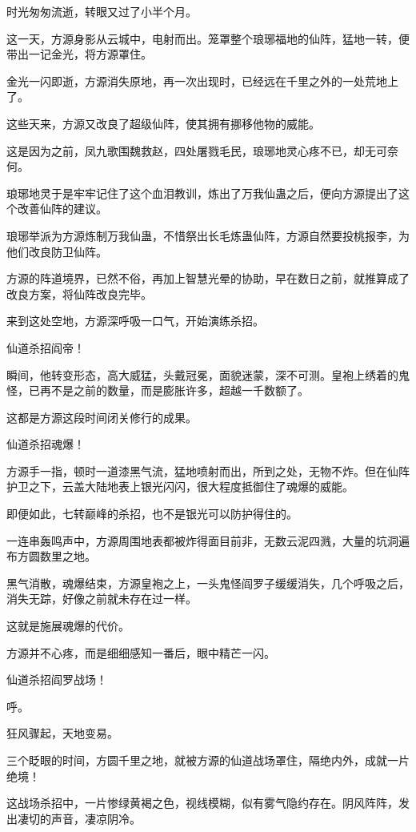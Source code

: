 
\begin{this_body}

时光匆匆流逝，转眼又过了小半个月。

这一天，方源身影从云城中，电射而出。笼罩整个琅琊福地的仙阵，猛地一转，便带出一记金光，将方源罩住。

金光一闪即逝，方源消失原地，再一次出现时，已经远在千里之外的一处荒地上了。

这些天来，方源又改良了超级仙阵，使其拥有挪移他物的威能。

这是因为之前，凤九歌围魏救赵，四处屠戮毛民，琅琊地灵心疼不已，却无可奈何。

琅琊地灵于是牢牢记住了这个血泪教训，炼出了万我仙蛊之后，便向方源提出了这个改善仙阵的建议。

琅琊举派为方源炼制万我仙蛊，不惜祭出长毛炼蛊仙阵，方源自然要投桃报李，为他们改良防卫仙阵。

方源的阵道境界，已然不俗，再加上智慧光晕的协助，早在数日之前，就推算成了改良方案，将仙阵改良完毕。

来到这处空地，方源深呼吸一口气，开始演练杀招。

仙道杀招阎帝！

瞬间，他转变形态，高大威猛，头戴冠冕，面貌迷蒙，深不可测。皇袍上绣着的鬼怪，已再不是之前的数量，而是膨胀许多，超越一千数额了。

这都是方源这段时间闭关修行的成果。

仙道杀招魂爆！

方源手一指，顿时一道漆黑气流，猛地喷射而出，所到之处，无物不炸。但在仙阵护卫之下，云盖大陆地表上银光闪闪，很大程度抵御住了魂爆的威能。

即便如此，七转巅峰的杀招，也不是银光可以防护得住的。

一连串轰鸣声中，方源周围地表都被炸得面目前非，无数云泥四溅，大量的坑洞遍布方圆数里之地。

黑气消散，魂爆结束，方源皇袍之上，一头鬼怪阎罗子缓缓消失，几个呼吸之后，消失无踪，好像之前就未存在过一样。

这就是施展魂爆的代价。

方源并不心疼，而是细细感知一番后，眼中精芒一闪。

仙道杀招阎罗战场！

呼。

狂风骤起，天地变易。

三个眨眼的时间，方圆千里之地，就被方源的仙道战场罩住，隔绝内外，成就一片绝境！

这战场杀招中，一片惨绿黄褐之色，视线模糊，似有雾气隐约存在。阴风阵阵，发出凄切的声音，凄凉阴冷。


\end{this_body}
